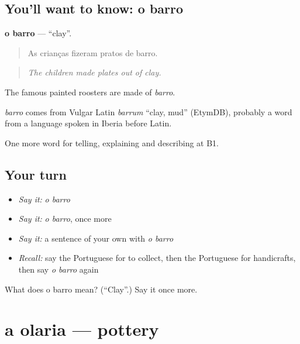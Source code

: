 \subsection*{You'll want to know: o barro}
\textbf{o barro} — \textquotedblleft{}clay\textquotedblright{}.

\begin{quote}
As crianças fizeram pratos de barro.
\end{quote}

\begin{quote}
\emph{The children made plates out of clay.}
\end{quote}

The famous painted roosters are made of \emph{barro}.

\begin{cousinweb}
\emph{barro} comes from Vulgar Latin \emph{barrum} \textquotedblleft{}clay, mud\textquotedblright{} (EtymDB), probably a word from a language spoken in Iberia before Latin.
\end{cousinweb}

\begin{grammarlens}[title={What you've built}]
One more word for telling, explaining and describing at B1.
\end{grammarlens}

\subsection*{Your turn}
\begin{itemize}
\raggedright
  \item \emph{Say it:} \emph{o barro}
  \item \emph{Say it:} \emph{o barro}, once more
  \item \emph{Say it:} a sentence of your own with \emph{o barro}
  \item \emph{Recall:} say the Portuguese for to collect, then the Portuguese for handicrafts, then say \emph{o barro} again
\end{itemize}

\begin{tcolorbox}[breakable,colback=teal!4,colframe=teal!35!black,title={Before you move on}]
What does o barro mean? (\textquotedblleft{}Clay\textquotedblright{}.) Say it once more.
\end{tcolorbox}
\section[a olaria]{a olaria — pottery}

